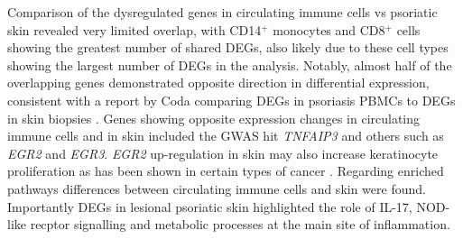 Comparison of the dysregulated genes in circulating immune cells vs psoriatic skin revealed very limited overlap, with CD14$^+$ monocytes and CD8$^+$ cells showing the greatest number of shared DEGs, also likely due to these cell types showing the largest number of DEGs in the analysis.   %
Notably, almost half of the overlapping genes demonstrated opposite direction in differential expression, consistent with a report by Coda comparing DEGs in psoriasis PBMCs to DEGs in skin biopsies \parencite{Coda2012}. Genes showing opposite expression changes in circulating immune cells and in skin included the GWAS hit \textit{TNFAIP3} and others such as  \textit{EGR2} and \textit{EGR3}. %
\textit{EGR2} up-regulation in skin may also increase keratinocyte proliferation as has been shown in certain types of cancer \parencite{Wu2010}. Regarding enriched pathways differences between circulating immune cells and skin were found. Importantly DEGs in lesional psoriatic skin highlighted the role of IL-17, NOD-like recptor signalling and metabolic processes at the main site of inflammation.






